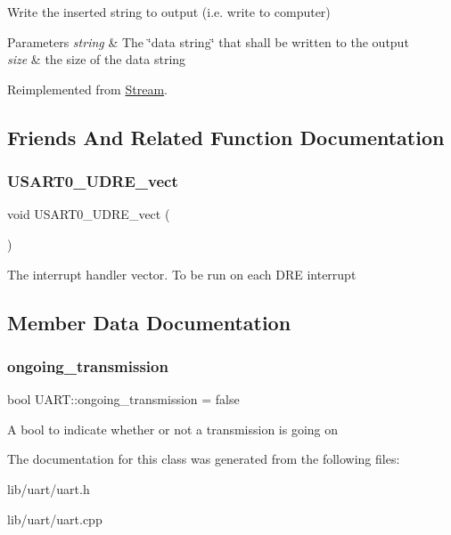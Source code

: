 Write the inserted string to output (i.\+e. write to computer) 
\begin{DoxyParams}{Parameters}
{\em string} & The \char`\"{}data string\char`\"{} that shall be written to the output \\
\hline
{\em size} & the size of the data string \\
\hline
\end{DoxyParams}


Reimplemented from \hyperlink{class_stream_a508be3423e4d99ab2757275fb723002a}{Stream}.



\subsection{Friends And Related Function Documentation}
\hypertarget{class_u_a_r_t_accc13d37cd82c841e387e1d5cf4d9a94}{}\label{class_u_a_r_t_accc13d37cd82c841e387e1d5cf4d9a94} 
\subsubsection{\texorpdfstring{U\+S\+A\+R\+T0\+\_\+\+U\+D\+R\+E\+\_\+vect}{USART0\_UDRE\_vect}}
{\footnotesize\ttfamily void U\+S\+A\+R\+T0\+\_\+\+U\+D\+R\+E\+\_\+vect (\begin{DoxyParamCaption}{ }\end{DoxyParamCaption})\hspace{0.3cm}{\ttfamily [friend]}}

The interrupt handler vector. To be run on each D\+RE interrupt 

\subsection{Member Data Documentation}
\hypertarget{class_u_a_r_t_ae98e7d277a1833478aa85dc9e686150a}{}\label{class_u_a_r_t_ae98e7d277a1833478aa85dc9e686150a} 
\subsubsection{\texorpdfstring{ongoing\+\_\+transmission}{ongoing\_transmission}}
{\footnotesize\ttfamily bool U\+A\+R\+T\+::ongoing\+\_\+transmission = false\hspace{0.3cm}{\ttfamily [private]}}

A bool to indicate whether or not a transmission is going on 

The documentation for this class was generated from the following files\+:\begin{DoxyCompactItemize}
\item 
lib/uart/uart.\+h\item 
lib/uart/uart.\+cpp\end{DoxyCompactItemize}
